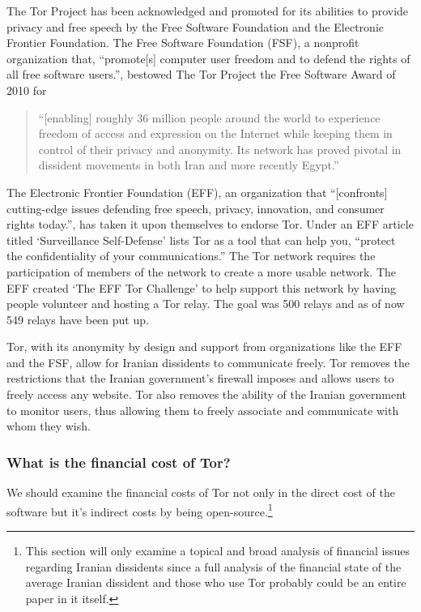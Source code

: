 \documentclass[11pt]{article}
\begin{document}
\begin{multicols}{2}
The Tor Project has been acknowledged and promoted for its abilities to provide
privacy and free speech by the Free Software Foundation and the Electronic
Frontier Foundation.
The Free Software Foundation (FSF), a nonprofit organization that, ``promote[s]
computer user freedom and to defend the rights of all free software
users.''\cite{FSF:About}, bestowed The Tor Project the Free Software Award of 2010
for
\begin{quotation}
  ``[enabling] roughly 36 million people around the world to
  experience freedom of access and expression on the Internet while keeping them
  in control of their privacy and anonymity. Its network has proved pivotal in
  dissident movements in both Iran and more recently
  Egypt.''\cite{FreeSoftwareAwards} 
\end{quotation}
The Electronic Frontier Foundation (EFF), an organization that ``[confronts]
cutting-edge issues defending free speech, privacy, innovation, and consumer
rights today.''\cite{EFF:About}, has taken it upon themselves to endorse Tor.
Under an EFF article titled `Surveillance Self-Defense' lists Tor as a tool that
can help you, ``protect the confidentiality of your
communications.''\cite{EFF:Tor} The Tor network requires the participation of
members of the network to create a more usable network. The EFF created `The EFF
Tor Challenge' to help support this network by having people volunteer and
hosting a Tor relay.\cite{EFF:TorChallenge} The goal was 500 relays and as of
now 549 relays have been put up.\cite{EFF:TorChallenge}

Tor, with its anonymity by design and support from organizations like the EFF
and the FSF, allow for Iranian dissidents to communicate freely. Tor removes the restrictions
that the Iranian government's firewall imposes and allows users to freely access
any website. Tor also removes the ability of the Iranian government to monitor
users, thus allowing them to freely associate and communicate with whom they
wish. 

\subsubsection{What is the financial cost of Tor?}

We should examine the financial costs of Tor not only in the direct cost of the
software but it's indirect costs by being open-source.\footnote{This section
  will only examine a topical and broad analysis of financial issues regarding
  Iranian dissidents since a full analysis of the financial state of the average
Iranian dissident and those who use Tor probably could be an entire paper in it
itself.}


\end{multicols}
\end{document}
